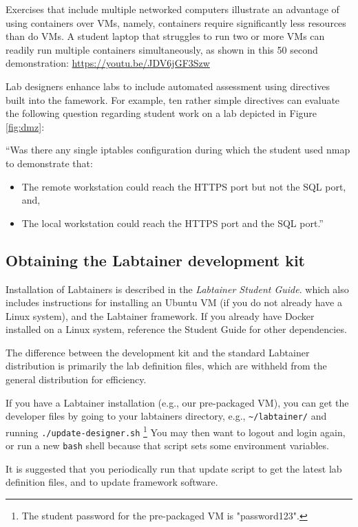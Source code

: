 \documentclass[12pt]{article}
\begin{document}
Exercises that include multiple networked computers illustrate an advantage 
of using containers over VMs, namely, containers require significantly less resources
than do VMs.  A student laptop that struggles to run two or more VMs can readily 
run multiple containers simultaneously, as shown in this 50 second demonstration: \url{https://youtu.be/JDV6jGF3Szw} 

Lab designers enhance labs to include automated assessment using directives built into the famework.
For example, ten rather simple directives can evaluate the following question regarding student
work on a lab depicted in Figure \ref{fig:dmz}:

``Was there any
single iptables configuration during which the student used nmap to demonstrate that:
\begin{itemize}
\item The remote workstation could reach the HTTPS port but not the SQL port, and,
\item The local workstation could reach the HTTPS port and the SQL port.''
\end{itemize}

\subsection {Obtaining the Labtainer development kit}
Installation of Labtainers is described in the \textit{Labtainer Student Guide}.  
which also includes instructions for installing an Ubuntu VM (if you do not already have a Linux system),
and the Labtainer framework.  If you already have Docker installed on a Linux system, 
reference the Student Guide for other dependencies. 

The difference between the development kit and the standard Labtainer distribution is primarily
the lab definition files, which are withheld from the general distribution for efficiency.

If you have a Labtainer installation (e.g., our pre-packaged VM), you can get the developer files by going to your
labtainers directory, e.g., {\tt \~{}/labtainer/} and running {\tt ./update-designer.sh}
\footnote{The student password for the pre-packaged VM is "password123".}
You may then want to logout and login again, or run a new {\tt bash} shell because that script
sets some environment variables.

It is suggested that you periodically run that update script to get the latest lab definition files,
and to update framework software.   
\end{document}
